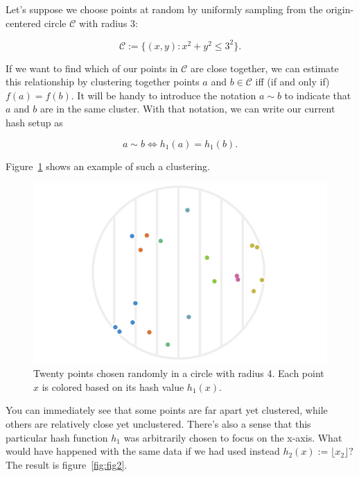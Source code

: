 \documentclass[20pt,]{extarticle}
\begin{document}
Let's suppose we choose points at random by uniformly sampling from the
origin-centered circle \(\mathcal C\) with radius 3:

\[ \mathcal C := \{ (x, y) : x^2 + y^2 \le 3^2 \}. \]

If we want to find which of our points in \(\mathcal C\) are close
together, we can estimate this relationship by clustering together
points \(a\) and \(b \in \mathcal C\) iff (if and only if)
\(f(a) = f(b).\) It will be handy to introduce the notation \(a \sim b\)
to indicate that \(a\) and \(b\) are in the same cluster. With that
notation, we can write our current hash setup as

\[ a \sim b \iff h_1(a) = h_1(b). \]

Figure~\ref{fig:fig1} shows an example of such a clustering.

\begin{figure}
\centering
\includegraphics{images/lsh_image1_v2.png}
\caption{Twenty points chosen randomly in a circle with radius 4. Each
point \(x\) is colored based on its hash value
\(h_1(x).\)}\label{fig:fig1}
\end{figure}

You can immediately see that some points are far apart yet clustered,
while others are relatively close yet unclustered. There's also a sense
that this particular hash function \(h_1\) was arbitrarily chosen to
focus on the x-axis. What would have happened with the same data if we
had used instead \(h_2(x) := \lfloor x_2 \rfloor?\) The result is
figure~\ref{fig:fig2}.
\end{document}
